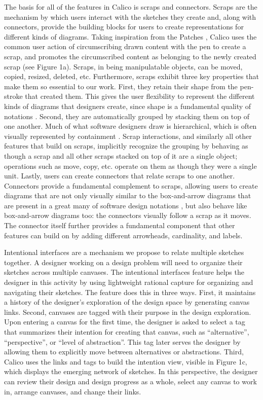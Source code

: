 The basis for all of the features in Calico is scraps and connectors. Scraps are the mechanism by which users interact with the sketches they create and, along with connectors, provide the building blocks for users to create representations for different kinds of diagrams. Taking inspiration from the Patches \cite{Kramer}, Calico uses the common user action of circumscribing drawn content with the pen \cite{Hendry} to create a scrap, and promotes the circumscribed content as belonging to the newly created scrap (see Figure 1a). Scraps, in being manipulatable objects, can be moved, copied, resized, deleted, etc. Furthermore, scraps exhibit three key properties that make them so essential to our work. First, they retain their shape from the pen-stroke that created them. This gives the user flexibility to represent the different kinds of diagrams that designers create, since shape is a fundamental quality of notations \cite{moody2009physics}. Second, they are automatically grouped by stacking them on top of one another. Much of what software designers draw is hierarchical, which is often visually represented by containment \cite{Moody:2009:TDV:1685992.1686136}. Scrap interactions, and similarly all other features that build on scraps, implicitly recognize the grouping by behaving as though a scrap and all other scraps stacked on top of it are a single object; operations such as move, copy, etc. operate on them as though they were a single unit. Lastly, users can create connectors that relate scraps to one another. Connectors provide a fundamental complement to scraps, allowing users to create diagrams that are not only visually similar to the box-and-arrow diagrams that are present in a great many of software design notations \cite{Shaw:1993:PCA:645540.657852}, but also behave like box-and-arrow diagrams too: the connectors visually follow a scrap as it moves. The connector itself further provides a fundamental component that other features can build on by adding different arrowheads, cardinality, and labels. 

Intentional interfaces are a mechanism we propose to relate multiple sketches together. A designer working on a design problem will need to organize their sketches across multiple canvases. The intentional interfaces feature helps the designer in this activity by using lightweight rational capture for organizing and navigating their sketches. The feature does this in three ways. First, it maintains a history of the designer’s exploration of the design space by generating canvas links. Second, canvases are tagged with their purpose in the design exploration. Upon entering a canvas for the first time, the designer is asked to select a tag that summarizes their intention for creating that canvas, such as ``alternative'', ``perspective'', or ``level of abstraction''. This tag later serves the designer by allowing them to explicitly move between alternatives or abstractions. Third, Calico uses the links and tags to build the intention view, visible in Figure 1c, which displays the emerging network of sketches. In this perspective, the designer can review their design and design progress as a whole, select any canvas to work in, arrange canvases, and change their links. 

